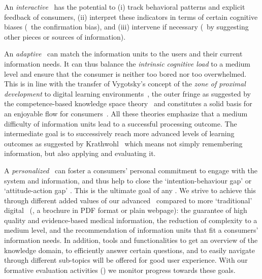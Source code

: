 An \emph{interactive} \chis\ has the potential to (i) track behavioral patterns and explicit feedback of consumers, (ii) interpret these indicators in terms of certain cognitive biases (\eg\ the confirmation bias), and (iii) intervene if necessary (\eg\ by suggesting other pieces or sources of information). 

An \emph{adaptive} \chis\ can match the information units to the users and their current information needs. 
%
It can thus balance the \emph{intrinsic cognitive load} to a medium level and ensure that the consumer is neither too bored nor too overwhelmed. 
%
This is in line with the transfer of Vygotsky’s concept of the \emph{zone of proximal development} to digital learning environments~\cite{luckin2010re}, the outer fringe as suggested by the competence-based knowledge space theory~\cite{heller2006competence} and constitutes a solid basis for an enjoyable flow for consumers~\cite{schiefele2011skills}. 
%
All these theories emphasize that a medium difficulty of information units lead to a successful processing outcome. The intermediate goal is to successively reach more advanced levels of learning outcomes as suggested by Krathwohl~\cite{krathwohl2002revision} which means not simply remembering information, but also applying and evaluating it.


A \emph{personalized} \chis\ can foster a consumers’ personal commitment to engage with the system and information, and thus help to close the `intention-behaviour gap’ or `attitude-action gap' \cite{schwarzer2008modeling}. 
%
This is the ultimate goal of any \chis. 
%
We strive to achieve this through different added values of our advanced \chis\ compared to more `traditional’ digital \chis\ (\eg, a brochure in PDF format or plain webpage): the guarantee of high quality and evidence-based medical information, the reduction of complexity to a medium level, and the recommendation of information units that fit a consumers’ information needs. 
%
In addition, tools and functionalities to get an overview of the knowledge domain, to efficiently answer certain questions, and to easily navigate through different sub-topics will be offered for good user experience. With our formative evaluation activities () we monitor progress towards these goals.






